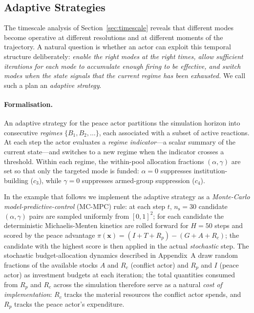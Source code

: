 
\subsection{Adaptive Strategies}
\label{sec:adaptive}

The timescale analysis of Section~\ref{sec:timescale} reveals that different
modes become operative at different resolutions and at different moments of the
trajectory.  A natural question is whether an actor can exploit this temporal
structure deliberately: \emph{enable the right modes at the right times, allow
sufficient iterations for each mode to accumulate enough firing to be effective,
and switch modes when the state signals that the current regime has been
exhausted.}  We call such a plan an \emph{adaptive strategy}.

\paragraph{Formalisation.}
An adaptive strategy for the peace actor partitions the simulation horizon into
consecutive \emph{regimes} $\{B_1, B_2, \ldots\}$, each associated with a
subset of active reactions.  At each step the actor evaluates a \emph{regime
indicator}---a scalar summary of the current state---and switches to a new
regime when the indicator crosses a threshold.  Within each regime, the
within-pool allocation fractions $(\alpha, \gamma)$ are set so that only the
targeted mode is funded: $\alpha = 0$ suppresses institution-building ($c_3$),
while $\gamma = 0$ suppresses armed-group suppression ($c_4$).

In the example that follows we implement the adaptive strategy as a
\emph{Monte-Carlo model-predictive-control} (MC-MPC) rule: at each step $t$,
$n_{\mathrm{s}} = 30$ candidate $(\alpha, \gamma)$ pairs are sampled uniformly
from $[0,1]^2$; for each candidate the deterministic Michaelis-Menten kinetics
are rolled forward for $H = 50$ steps and scored by the peace advantage
$\pi(\mathbf{x}) = (I + T + R_p) - (G + A + R_c)$; the candidate with the
highest score is then applied in the actual \emph{stochastic} step.  The
stochastic budget-allocation dynamics described in
Appendix~A draw random fractions of the available stocks $A$ and $R_c$
(conflict actor) and $R_p$ and $I$ (peace actor) as investment budgets at
each iteration; the total quantities consumed from $R_p$ and $R_c$ across the
simulation therefore serve as a natural \emph{cost of implementation}:
$R_c$ tracks the material resources the conflict actor spends, and $R_p$ tracks
the peace actor's expenditure.

